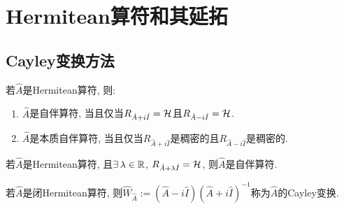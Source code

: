 \chapter{Hermitean算符和其延拓}

\section{Cayley变换方法}

\begin{theorem}
    若$\hat{A}$是Hermitean算符, 则:
    \begin{enumerate}
        \item $\hat{A}$是自伴算符, 当且仅当$R_{\hat{A}+i\hat{I}}=\mathcal{H}$且$R_{\hat{A}-i\hat{I}}=\mathcal{H}$.
        \item $\hat{A}$是本质自伴算符, 当且仅当$R_{\hat{A}+i\hat{I}}$是稠密的且$R_{\hat{A}-i\hat{I}}$是稠密的.
    \end{enumerate}
\end{theorem}
\begin{theorem}
    若$\hat{A}$是Hermitean算符, 且$\exists\,\lambda\in\mathbb{R}$, $R_{\hat{A}+\lambda\hat{I}}=\mathcal{H}$, 则$\hat{A}$是自伴算符.
\end{theorem}

\begin{definition}
    若$\hat{A}$是闭Hermitean算符, 则$\hat{W}_{\hat{A}}:=(\hat{A}-i\hat{I})(\hat{A}+i\hat{I})^{-1}$称为$\hat{A}$的Cayley变换.
\end{definition}
